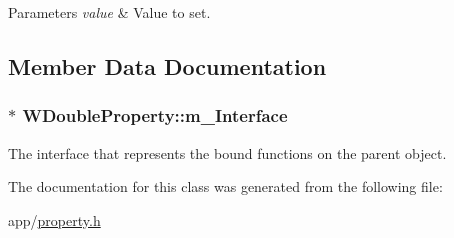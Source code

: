 \begin{DoxyParams}{Parameters}
{\em value} & Value to set. \\
\hline
\end{DoxyParams}


\subsection{Member Data Documentation}
\hypertarget{class_w_double_property_aa40ee58413b2eb1431bcc98962e59c64}{
\subsubsection[{m\-\_\-\-Interface}]{$\ast$ W\-Double\-Property\-::m\-\_\-\-Interface\hspace{0.3cm}{\ttfamily [protected]}}}\label{class_w_double_property_aa40ee58413b2eb1431bcc98962e59c64}
The interface that represents the bound functions on the parent object. 

The documentation for this class was generated from the following file\-:\begin{DoxyCompactItemize}
\item 
app/\hyperlink{property_8h}{property.\-h}\end{DoxyCompactItemize}
